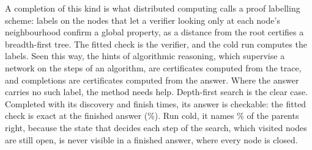 A completion of this kind is what distributed computing calls a proof labelling scheme: labels on the nodes that let a
verifier looking only at each node's neighbourhood confirm a global property, as a distance from the root certifies a
breadth-first tree\cite{korman2010proof,goos2016locally}. The fitted check is the verifier, and the cold run computes the
labels. Seen this way, the hints of algorithmic reasoning, which supervise a network on the steps of an algorithm, are
certificates computed from the trace, and completions are certificates computed from the answer. Where the answer
carries no such label, the method needs help. Depth-first search is the clear case. Completed with its discovery and
finish times, its answer is checkable: the fitted check is exact at the finished answer (\%). Run cold,
it names \% of the parents right, because the state that decides each step of the search, which visited
nodes are still open, is never visible in a finished answer, where every node is closed.
